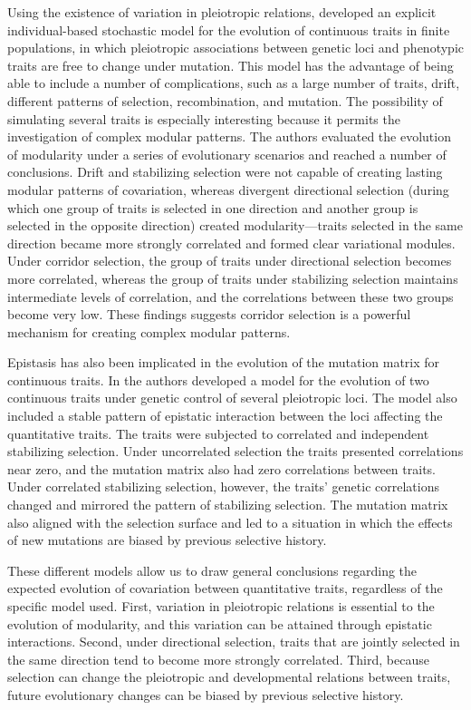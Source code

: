 \begin{refsection}
Using the existence of variation in pleiotropic relations,
\textcite{Melo2015-bk} developed an
explicit individual-based stochastic model for the evolution of
continuous traits in finite populations, in which pleiotropic
associations between genetic loci and phenotypic traits are free to
change under mutation. This model has the advantage of being able to
include a number of complications, such as a large number of traits,
drift, different patterns of selection, recombination, and mutation. The
possibility of simulating several traits is especially interesting
because it permits the investigation of complex modular patterns. The
authors evaluated the evolution of modularity under a series of
evolutionary scenarios and reached a number of conclusions. Drift and
stabilizing selection were not capable of creating lasting modular
patterns of covariation, whereas divergent directional selection (during
which one group of traits is selected in one direction and another group
is selected in the opposite direction) created modularity---traits
selected in the same direction became more strongly correlated and
formed clear variational modules. Under corridor selection, the group of
traits under directional selection becomes more correlated, whereas the
group of traits under stabilizing selection maintains intermediate
levels of correlation, and the correlations between these two groups
become very low. These findings suggests corridor selection is a
powerful mechanism for creating complex modular patterns.

Epistasis has also been implicated in the evolution of the mutation
matrix for continuous traits. In \textcite{Jones2014-wj} the authors developed a model for the evolution of two
continuous traits under genetic control of several pleiotropic loci. The
model also included a stable pattern of epistatic interaction between
the loci affecting the quantitative traits. The traits were subjected to
correlated and independent stabilizing selection. Under uncorrelated
selection the traits presented correlations near zero, and the mutation
matrix also had zero correlations between traits. Under correlated
stabilizing selection, however, the traits' genetic correlations changed
and mirrored the pattern of stabilizing selection. The mutation matrix
also aligned with the selection surface and led to a situation in which
the effects of new mutations are biased by previous selective history.

These different models allow us to draw general conclusions regarding
the expected evolution of covariation between quantitative traits,
regardless of the specific model used. First, variation in pleiotropic
relations is essential to the evolution of modularity, and this
variation can be attained through epistatic interactions. Second, under
directional selection, traits that are jointly selected in the same
direction tend to become more strongly correlated. Third, because
selection can change the pleiotropic and developmental relations between
traits, future evolutionary changes can be biased by previous selective
history.


\end{refsection}
